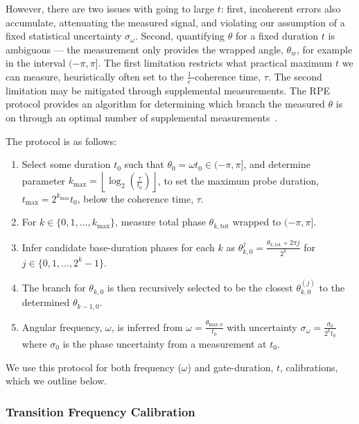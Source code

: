 However, there
are two issues with going to large $t$: first, incoherent errors also
accumulate, attenuating the measured signal, and violating our assumption of a
fixed statistical uncertainty $\sigma_\omega$. Second, quantifying $\theta$ for a fixed duration $t$ is
ambiguous --- the measurement only provides the wrapped angle, $\theta_w$, for example in the interval $( -\pi,\pi ]$. The first limitation restricts what practical maximum $t$ we can measure, heuristically often set to the $\frac{1}{e}$-coherence time, $\tau$. The second limitation may be mitigated through supplemental measurements. The
RPE protocol provides an algorithm for determining which branch the measured $\theta$ is on through an optimal number of supplemental measurements~\cite{kimmel_robust_2015}.

The protocol is as follows:
\begin{enumerate}
\item Select some duration $t_0$ such that $\theta_0=\omega t_0 \in (-\pi, \pi]$, and determine parameter $k_\mathrm{max}=\left\lfloor \log_2\left(\frac{\tau}{t_0}\right)\right\rfloor$, to set the maximum probe duration, $t_\mathrm{max}=2^{k_\mathrm{max}} t_0$, below the coherence time, $\tau$.
\item For $k\in\{0,1,...,k_\mathrm{max}\}$, measure total phase $\theta_{k,\mathrm{tot}}$ wrapped to $(-\pi, \pi]$.
\item Infer candidate base-duration phases for each $k$ as $\theta_{k,0}^{j} = \frac{\theta_{k,\mathrm{tot}}+2\pi j}{2^k}$ for $j\in \{0,1,...,2^k-1\}$.
\item The branch for $\theta_{k,0}$ is then recursively selected to be the closest $\theta_{k,0}^{(j)}$ to the determined $\theta_{k-1,0}$.
\item Angular frequency, $\omega$, is inferred from $\omega=\frac{\theta_{\mathrm{max},0}}{t_0}$ with uncertainty $\sigma_\omega = \frac{\sigma_0}{2^k t_0}$ where $\sigma_0$ is the phase uncertainty from a measurement at $t_0$.
\end{enumerate}
We use this protocol for both frequency ($\omega$) and gate-duration, $t$,
calibrations, which we outline below.


\subsubsection{Transition Frequency Calibration}

